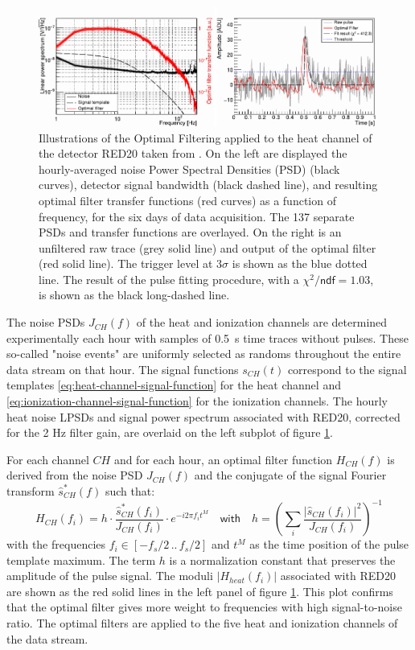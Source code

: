 \begin{figure}
\centering
\includegraphics[scale=1]{Figures/ElectrodesExperimental/of_illustration.pdf}
\caption{Illustrations of the Optimal Filtering applied to the heat channel of the detector RED20 taken from \cite{Armengaud:2019kfj}. On the left are displayed the hourly-averaged noise Power Spectral Densities (PSD) (black curves), detector signal bandwidth (black dashed line), and resulting optimal filter transfer functions (red
curves) as a function of frequency, for the six days of data acquisition. The 137 separate PSDs
and transfer functions are overlayed. On the right is an unfiltered raw trace
(grey solid line) and output of the optimal filter (red solid line). The trigger level at $3\sigma$ is shown
as the blue dotted line. The result of the pulse fitting procedure, with a $\chi^2/\textsf{ndf} = 1.03$, is shown as the black long-dashed line.}
\label{fig:optimal-filtering}
\end{figure}

The noise PSDs $J_{CH}(f)$ of the heat and ionization channels are determined experimentally each hour with samples of \SI{0.5}{\s} time traces without pulses. These so-called "noise events" are uniformly selected as randoms throughout the entire data stream on that hour. The signal functions $s_{CH}(t)$ correspond to the signal templates \ref{eq:heat-channel-signal-function} for the heat channel and \ref{eq:ionization-channel-signal-function} for the ionization channels. The hourly heat noise LPSDs and signal power spectrum associated with RED20, corrected for the 2 Hz filter gain, are overlaid on the left subplot of figure \ref{fig:optimal-filtering}.

For each channel $CH$ and for each hour, an optimal filter function $H_{CH}(f)$ is derived from the noise PSD $J_{CH}(f)$ and the conjugate of the signal Fourier transform $\hat{s}^*_{CH}(f)$ such that:
\begin{equation}
\label{eq:optimal-filter}
H_{CH}(f_i) = 
h \cdot \frac{\hat{s}_{CH}^*(f_i)}{J_{CH}(f_i)}
\cdot e^{-i 2 \pi f_i t^M}
\quad \textsf{with} \quad
h =
\left( \sum_i
\frac{|\hat{s}_{CH}(f_i)|^2}{J_{CH}(f_i)}
 \right)^{-1}
\end{equation}
with the frequencies $f_i \in [-f_s/2\, .. \,f_s/2]$ and $t^M$ as the time position of the pulse template maximum. The term $h$ is a normalization constant that preserves the amplitude of the pulse signal. The moduli $|H_{heat}(f_i)|$ associated with RED20 are shown as the red solid lines in the left panel of figure \ref{fig:optimal-filtering}. This plot confirms that the optimal filter gives more weight to frequencies with high signal-to-noise ratio. The optimal filters are applied to the five heat and ionization channels of the data stream.

